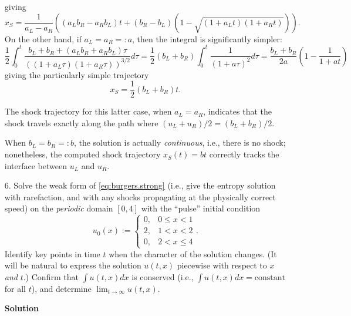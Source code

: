 \documentclass{article}
\begin{document}
\begin{itemize}
giving
\begin{equation*}
x_S = \frac{1}{a_L - a_R} \left( \left( a_L b_R - a_R b_L \right) t + \left( b_R - b_L \right) \left( 1 - \sqrt{\left( 1 + a_L t \right) \left( 1 + a_R t \right)} \right) \right).
\end{equation*}
On the other hand, if $a_L = a_R =: a$, then the integral is significantly simpler:
\begin{equation*}
\frac{1}{2} \int_0^t \frac{b_L + b_R + \left( a_L b_R + a_R b_L \right) \tau}{\left( \left( 1 + a_L \tau \right) \left( 1 + a_R \tau \right) \right)^{3/2}} d\tau = \frac{1}{2} \left( b_L + b_R \right) \int_0^t \frac{1}{\left( 1 + a \tau \right)^2} d\tau = \frac{b_L + b_R}{2a} \left( 1 - \frac{1}{1 + at} \right)
\end{equation*}
giving the particularly simple trajectory
\begin{equation*}
x_S = \frac{1}{2} \left( b_L + b_R \right) t.
\end{equation*}

The shock trajectory for this latter case, when $a_L = a_R$, indicates that the shock travels exactly along the path where $\left( u_L + u_R \right)/2 = \left( b_L + b_R \right)/2$.

When $b_L = b_R =: b$, the solution is actually \emph{continuous}, i.e., there is no shock; nonetheless, the computed shock trajectory $x_S(t) = b t$ correctly tracks the interface between $u_L$ and $u_R$.

\item[6.] Solve the weak form of \eqref{eq:burgers.strong} (i.e., give the entropy solution with rarefaction, and with any shocks propagating at the physically correct speed) on the \emph{periodic} domain $[0,4]$ with the ``pulse'' initial condition
\begin{equation}\label{eq:pulse}
u_0(x) := \begin{cases} 0, & 0 \leq x < 1 \\ 2, & 1 < x < 2 \\ 0, & 2 < x \leq 4 \end{cases}.
\end{equation}
Identify key points in time $t$ when the character of the solution changes. (It will be natural to express the solution $u(t,x)$ piecewise with respect to $x$ \emph{and} $t$.) Confirm that $\int u(t,x) dx$ is conserved (i.e., $\int u(t,x) dx = \text{constant}$ for all $t$), and determine $\lim_{t \to \infty} u(t,x)$.

\textbf{Solution}


\end{itemize}
\end{document}

